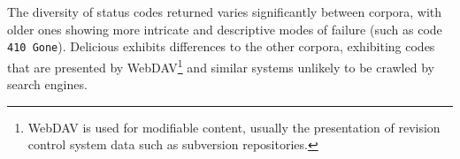 The diversity of status codes returned varies significantly between corpora, with older ones showing more intricate and descriptive modes of failure (such as code \texttt{410 Gone}).  Delicious exhibits differences to the other corpora, exhibiting codes that are presented by WebDAV\footnote{WebDAV is used for modifiable content, usually the presentation of revision control system data such as subversion repositories.} and similar systems unlikely to be crawled by search engines.%










